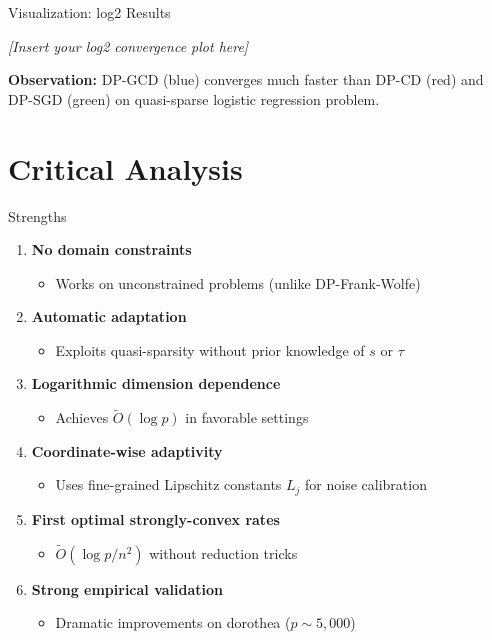 \documentclass{beamer}
\begin{document}
\begin{frame}{Visualization: log2 Results}
\begin{center}
\textit{[Insert your log2 convergence plot here]}
\end{center}

\vspace{-0.5em}

\textbf{Observation:} DP-GCD (blue) converges much faster than DP-CD (red) and DP-SGD (green) on quasi-sparse logistic regression problem.
\end{frame}

\section{Critical Analysis}

\begin{frame}{Strengths}
\begin{enumerate}
\item \textbf{No domain constraints}
\begin{itemize}
\item Works on unconstrained problems (unlike DP-Frank-Wolfe)
\end{itemize}

\item \textbf{Automatic adaptation}
\begin{itemize}
\item Exploits quasi-sparsity without prior knowledge of $s$ or $\tau$
\end{itemize}

\item \textbf{Logarithmic dimension dependence}
\begin{itemize}
\item Achieves $\widetilde{O}(\log p)$ in favorable settings
\end{itemize}

\item \textbf{Coordinate-wise adaptivity}
\begin{itemize}
\item Uses fine-grained Lipschitz constants $L_j$ for noise calibration
\end{itemize}

\item \textbf{First optimal strongly-convex rates}
\begin{itemize}
\item $\widetilde{O}(\log p / n^2)$ without reduction tricks
\end{itemize}

\item \textbf{Strong empirical validation}
\begin{itemize}
\item Dramatic improvements on dorothea ($p \sim 5{,}000$)
\end{itemize}
\end{enumerate}
\end{frame}
\end{document}

